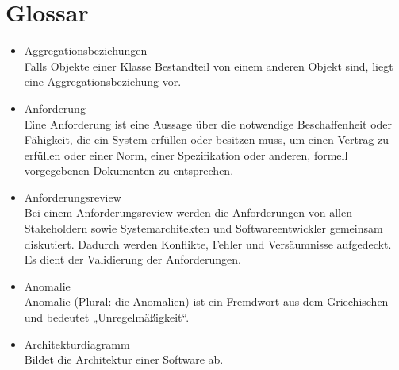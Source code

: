 \chapter{Glossar}
\begin{itemize}
\item 	Aggregationsbeziehungen\\
Falls Objekte einer Klasse Bestandteil von einem anderen Objekt sind, liegt eine Aggregationsbeziehung vor.
\item 	Anforderung\\
Eine Anforderung ist eine Aussage über die notwendige Beschaffenheit oder Fähigkeit, die ein System erfüllen oder besitzen muss, um einen Vertrag zu erfüllen oder einer Norm, einer Spezifikation oder anderen, formell vorgegebenen Dokumenten zu entsprechen.
\item 	Anforderungsreview\\
Bei einem Anforderungsreview werden die Anforderungen von allen Stakeholdern sowie Systemarchitekten und Softwareentwickler gemeinsam diskutiert. Dadurch werden Konflikte, Fehler und Versäumnisse aufgedeckt. Es dient der Validierung der Anforderungen.
\item Anomalie \\ Anomalie (Plural: die Anomalien) ist ein Fremdwort aus dem Griechischen und bedeutet „Unregelmäßigkeit“.
\item 	Architekturdiagramm\\
Bildet die Architektur einer Software ab.


\end{itemize}
